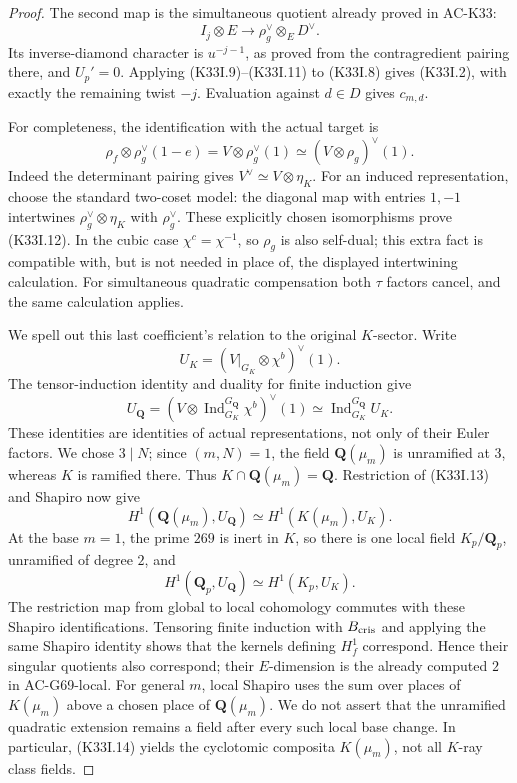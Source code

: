 \begin{proof}
The second map is the simultaneous quotient already proved in
AC-K33:
\[
 I_j\otimes E \longrightarrow \rho_g^\vee\otimes_E D^\vee.
                                                               \tag{K33I.11}
\]
Its inverse-diamond character is \(u^{-j-1}\), as proved from the
contragredient pairing there, and \(U_p'=0\).
Applying (K33I.9)--(K33I.11) to (K33I.8) gives (K33I.2), with exactly
the remaining twist \(-j\).  Evaluation against \(d\in D\) gives
\(c_{m,d}\).

For completeness, the identification with the actual target is
\[
 \rho_f\otimes\rho_g^\vee(1-e)
       =V\otimes\rho_g^\vee(1)
       \simeq(V\otimes\rho_g)^\vee(1).             \tag{K33I.12}
\]
Indeed the determinant pairing gives \(V^\vee\simeq V\otimes\eta_K\).
For an induced representation, choose the standard two-coset model:
the diagonal map with entries \(1,-1\) intertwines
\(\rho_g^\vee\otimes\eta_K\) with \(\rho_g^\vee\).
These explicitly chosen isomorphisms prove (K33I.12).
In the cubic case \(\chi^c=\chi^{-1}\), so \(\rho_g\) is also
self-dual; this extra fact is compatible with, but is not needed
in place of, the displayed intertwining calculation.
For simultaneous quadratic compensation both \(\tau\) factors
cancel, and the same calculation applies.

We spell out this last coefficient's relation to the original \(K\)-sector.
Write
\[
 U_K=(V|_{G_K}\otimes\chi^b)^\vee(1).
\]
The tensor-induction identity and duality for finite induction give
\[
 U_{\mathbf Q}=(V\otimes\operatorname{Ind}_{G_K}^{G_{\mathbf Q}}
                         \chi^b)^\vee(1)
       \simeq\operatorname{Ind}_{G_K}^{G_{\mathbf Q}}U_K.
                                                               \tag{K33I.13}
\]
These identities are identities of actual representations, not only
of their Euler factors.  We chose \(3\mid N\); since \((m,N)=1\),
the field \(\mathbf Q(\mu_m)\) is unramified at \(3\), whereas \(K\)
is ramified there.  Thus \(K\cap\mathbf Q(\mu_m)=\mathbf Q\).
Restriction of (K33I.13) and Shapiro now give
\[
 H^1(\mathbf Q(\mu_m),U_{\mathbf Q})
       \simeq H^1(K(\mu_m),U_K).                 \tag{K33I.14}
\]
At the base \(m=1\), the prime \(269\) is inert in \(K\), so there is
one local field \(K_p/\mathbf Q_p\), unramified of degree \(2\), and
\[
 H^1(\mathbf Q_p,U_{\mathbf Q})
       \simeq H^1(K_p,U_K).                      \tag{K33I.15}
\]
The restriction map from global to local cohomology commutes with
these Shapiro identifications.  Tensoring finite induction with
\(B_{\rm cris}\) and applying the same Shapiro identity shows that
the kernels defining \(H_f^1\) correspond.  Hence their singular
quotients also correspond; their \(E\)-dimension is the already
computed \(2\) in AC-G69-local.  For general \(m\), local Shapiro
uses the sum over places of \(K(\mu_m)\) above a chosen place of
\(\mathbf Q(\mu_m)\).  We do not assert that the unramified quadratic
extension remains a field after every such local base change.
In particular, (K33I.14) yields the cyclotomic composita
\(K(\mu_m)\), not all \(K\)-ray class fields.


\end{proof}
